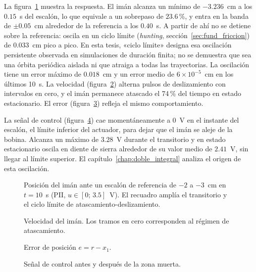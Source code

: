 La figura~\ref{posicion} muestra la respuesta. El imán alcanza un mínimo de $-3.236$~cm a los $0.15$~s del escalón, lo que equivale a un sobrepaso de $23.6$\,\%, y entra en la banda de $\pm0.05$~cm alrededor de la referencia a los $0.40$~s. A partir de ahí no se detiene sobre la referencia: oscila en un ciclo límite (\emph{hunting}, sección~\ref{sec:fund_friccion}) de $0.033$~cm pico a pico. En esta tesis, «ciclo límite» designa esa oscilación persistente observada en simulaciones de duración finita; no se demuestra que sea una órbita periódica aislada ni que atraiga a todas las trayectorias. La oscilación tiene un error máximo de $0.018$~cm y un error medio de $6\times10^{-5}$~cm en los últimos 10~s. La velocidad (figura~\ref{velocidad}) alterna pulsos de deslizamiento con intervalos en cero, y el imán permanece atascado el 74\,\% del tiempo en estado estacionario. El error (figura~\ref{error}) refleja el mismo comportamiento.

La señal de control (figura~\ref{senal_control}) cae momentáneamente a 0~V en el instante del escalón, el límite inferior del actuador, para dejar que el imán se aleje de la bobina. Alcanza un máximo de $3.28$~V durante el transitorio y en estado estacionario oscila en diente de sierra alrededor de su valor medio de $2.41$~V, sin llegar al límite superior. El capítulo~\ref{chap:doble_integral} analiza el origen de esta oscilación.

\begin{figure}[ht]
    \centering
    
    \caption[Posición (regulación)]{Posición del imán ante un escalón de referencia de $-2$ a $-3$~cm en $t=10$~s (PII, $u\in[0;\,3.5]$~V). El recuadro amplía el transitorio y el ciclo límite de atascamiento-deslizamiento.}
    \label{posicion}
\end{figure}

\begin{figure}[ht]
    \centering
    
    \caption[Velocidad (regulación)]{Velocidad del imán. Los tramos en cero corresponden al régimen de atascamiento.}
    \label{velocidad}
\end{figure}

\begin{figure}[ht]
    \centering
    
    \caption[Error (regulación)]{Error de posición $e=r-x_1$.}
    \label{error}
\end{figure}

\begin{figure}[ht]
    \centering
    
    \caption[Señal de control (regulación)]{Señal de control antes y después de la zona muerta.}
    \label{senal_control}
\end{figure}

